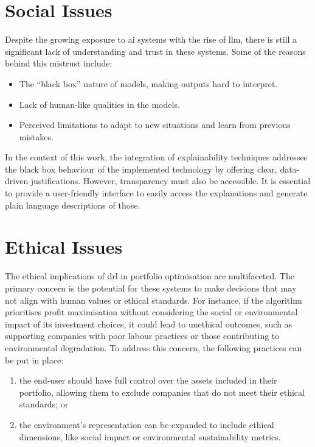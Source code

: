 \section{Social Issues} \label{sec:social-issues}

Despite the growing exposure to \acrfull{ai} systems with the rise of \acrfull{llm}, there is still a significant lack of understanding and trust in these systems. Some of the reasons behind this mistrust include:
\begin{itemize}
    \item The “black box” nature of models, making outputs hard to interpret.
    \item Lack of human-like qualities in the models.
    \item Perceived limitations to adapt to new situations and learn from previous mistakes.
\end{itemize}

In the context of this work, the integration of explainability techniques addresses the black box behaviour of the implemented technology by offering clear, data-driven justifications. However, transparency must also be accessible. It is essential to provide a user-friendly interface to easily access the explanations and generate plain language descriptions of those.

\section{Ethical Issues} \label{sec:ethical-issues}

The ethical implications of \acrshort{drl} in portfolio optimisation are multifaceted. The primary concern is the potential for these systems to make decisions that may not align with human values or ethical standards. For instance, if the algorithm prioritises profit maximisation without considering the social or environmental impact of its investment choices, it could lead to unethical outcomes, such as supporting companies with poor labour practices or those contributing to environmental degradation. To address this concern, the following practices can be put in place:
\begin{enumerate}
    \item the end-user should have full control over the assets included in their portfolio, allowing them to exclude companies that do not meet their ethical standards; or
    \item the environment's representation can be expanded to include ethical dimensions, like social impact or environmental sustainability metrics.
\end{enumerate}


